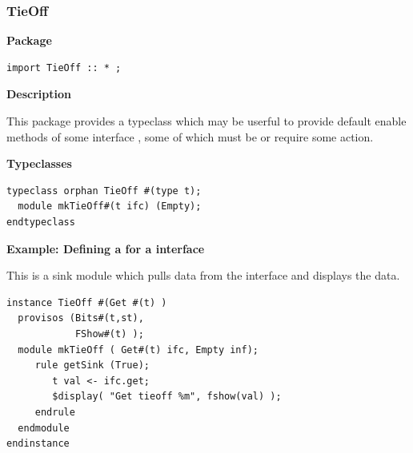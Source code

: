 \subsubsection{TieOff}
\label{lib-tieoff}

{\bf Package}


\begin{verbatim}
import TieOff :: * ;
\end{verbatim}



{\bf Description}

This package provides a typeclass  which may be
userful to provide default
enable methods of some interface , some of which must be
 or require some action.


{\bf Typeclasses}

\begin{verbatim}
typeclass orphan TieOff #(type t);
  module mkTieOff#(t ifc) (Empty);
endtypeclass
\end{verbatim}


{\bf Example: Defining a  for a  interface}

This is a  sink module which pulls data from the 
interface and displays the data.

\begin{verbatim}
instance TieOff #(Get #(t) )
  provisos (Bits#(t,st),
            FShow#(t) );
  module mkTieOff ( Get#(t) ifc, Empty inf);
     rule getSink (True);
        t val <- ifc.get;
        $display( "Get tieoff %m", fshow(val) );
     endrule
  endmodule
endinstance
\end{verbatim}
